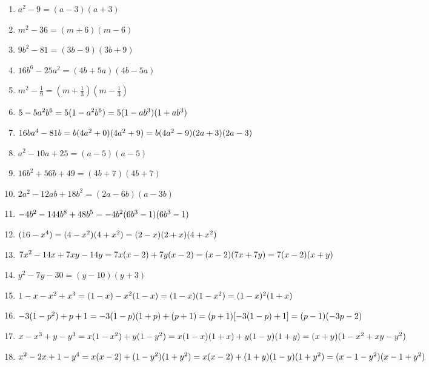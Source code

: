 \begin{eocsolutions}{}
{\begin{enumerate}[itemsep=6pt, label=\textbf{\arabic*}. ]
\begin{multicols}{2}
\begin{enumerate}[itemsep=5pt, label=\textbf{(\alph*)} ]
\item ${a}^{2}-9=(a - 3)(a + 3)$%
\item ${m}^{2}-36=(m + 6)(m - 6)$%
\item $9{b}^{2}-81=(3b - 9)(3b + 9)$%
\item $16{b}^{6}-25{a}^{2}=(4b + 5a)(4b - 5a)$%
\item ${m}^{2}-\frac{1}{9}=(m +\frac{1}{3})(m -\frac{1}{3})$%
\item $5-5{a}^{2}{b}^{6}\\=5(1-a^2b^6)\\=5(1 - ab^3)(1 + ab^3)$%
\item $16b{a}^{4}-81b\\=b(4a^2+0)(4a^2+9)\\=b(4a^2 - 9)(2a + 3)(2a - 3)$%
\item ${a}^{2}-10a+25=(a - 5)(a - 5)$%
\item $16{b}^{2}+56b+49=(4b + 7)(4b + 7)$%
\item $2{a}^{2}-12ab+18{b}^{2}=(2a - 6b)(a - 3b)$%
\item $-4{b}^{2}-144{b}^{8}+48{b}^{5}\\=-4b^2(6b^3 - 1)(6b^3 - 1)$%
\item $(16-{x}^{4})\\=(4-x^2)(4+x^2)\\=(2 - x)(2 + x)(4 + x^2)$%
\item ${7x}^{2}-14x+7xy-14y\\=7x(x-2)+7y(x-2)\\=(x-2)(7x+7y)\\=7(x - 2)(x + y)$%
\item ${y}^{2}-7y-30=(y - 10)(y + 3)$%
\item $1-x-{x}^{2}+{x}^{3}\\=(1-x)-x^2(1-x)\\=(1-x)(1-x^2)=(1 - x)^{2}(1 +x)$%
\item $-3(1-{p}^{2})+p+1\\ =-3(1-p)(1+p)+(p+1)\\=(p+1)[-3(1-p)+1]\\=(p - 1)(-3p-2)$%
\item $x-x^3+y-y^3\\=x(1-x^2)+y(1-y^2)\\=x(1-x)(1+x)+y(1-y)(1+y)\\=(x+y)(1-x^2+xy-y^2)$
\item $x^2-2x+1-y^4\\=x(x-2)+(1-y^2)(1+y^2)\\=x(x-2)+(1+y)(1-y)(1+y^2)\\=(x-1-y^2)(x-1+y^2)$

\end{enumerate}
\end{multicols}
\end{enumerate}}
\end{eocsolutions}
